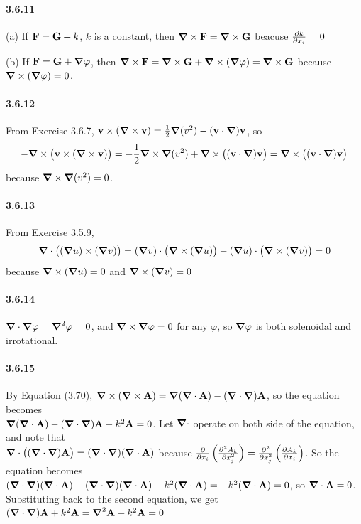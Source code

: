 \documentclass[a4paper]{article}
\begin{document}
\paragraph{3.6.11}
(a) If $\V{F}=\V{G}+k$, $k$ is a constant, then $\del\times\V{F}=\del\times\V{G}$ beacuse $\pdv{k}{x_i}=0$

(b) If $\V{F}=\V{G}+\del\varphi$, then $\del\times\V{F}=\del\times\V{G}+\del\times(\del\varphi)=\del\times\V{G}$ because $\del\times(\del\varphi)=0$. 

\paragraph{3.6.12}
From Exercise 3.6.7, $\V{v}\times(\del\times\V{v})=\frac{1}{2}\del(v^2)-(\V{v}\cdot\del)\V{v}$, so \[-\del\times\big(\V{v}\times(\del\times\V{v})\big)=-\frac{1}{2}\del\times\del(v^2)+\del\times\big((\V{v}\cdot\del)\V{v} \big)=\del\times\big((\V{v}\cdot\del)\V{v} \big)\]
because $\del\times\del(v^2)=0$.

\paragraph{3.6.13}
From Exercise 3.5.9, 
\[\del\cdot\big((\del u)\times(\del v) \big)=(\del v)\cdot\big(\del\times(\del u) \big)-(\del u)\cdot\big(\del\times(\del v) \big)=0\]
because $\del\times(\del u)=0$ and $\del\times(\del v)=0$

\paragraph{3.6.14}
$\del\cdot\del\varphi=\del^2\varphi=0$, and $\del\times\del\varphi=0$ for any $\varphi$, so $\del\varphi$ is both solenoidal and irrotational.

\paragraph{3.6.15}
By Equation (3.70), $\del\times(\del\times\V{A})=\del(\del\cdot\V{A})-(\del\cdot\del)\V{A}$, so the equation becomes\\ $\del(\del\cdot\V{A})-(\del\cdot\del)\V{A}-k^2\V{A}=0$. Let $\del\cdot$ operate on both side of the equation, and note that\\ $\del\cdot\big((\del\cdot\del)\V{A} \big)=(\del\cdot\del)(\del\cdot\V{A})$ because $\pdv{}{x_i}\left(\pdv{^2A_k}{x_j^2} \right)=\pdv{^2}{x_j^2}\left(\pdv{A_k}{x_i} \right)$. So the equation becomes\\ $(\del\cdot\del)(\del\cdot\V{A})-(\del\cdot\del)(\del\cdot\V{A})-k^2(\del\cdot\V{A})=-k^2(\del\cdot\V{A})=0$, so $\del\cdot\V{A}=0$. Substituting back to the second equation, we get  $(\del\cdot\del)\V{A}+k^2\V{A}=\del^2\V{A}+k^2\V{A}=0$
\end{document}

